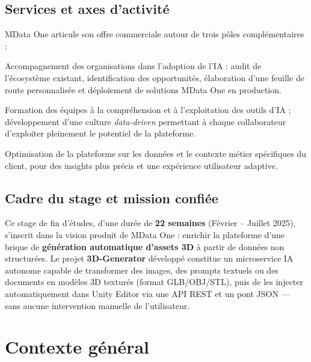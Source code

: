 \documentclass[12pt,a4paper,oneside]{report}
\begin{document}
\subsection{Services et axes d'activité}

MData One articule son offre commerciale autour de trois pôles
complémentaires :

\begin{description}[leftmargin=2.5cm,style=nextline]
  \item[\textbf{AI Integration Consulting}]
    Accompagnement des organisations dans l'adoption de l'IA :
    audit de l'écosystème existant, identification des opportunités,
    élaboration d'une feuille de route personnalisée et déploiement
    de solutions MData One en production.

  \item[\textbf{AI Education \& Enablement}]
    Formation des équipes à la compréhension et à l'exploitation des
    outils d'IA ; développement d'une culture \textit{data-driven}
    permettant à chaque collaborateur d'exploiter pleinement le potentiel
    de la plateforme.

  \item[\textbf{Data Fine-Tuning \& Personalization}]
    Optimisation de la plateforme sur les données et le contexte métier
    spécifiques du client, pour des insights plus précis et une
    expérience utilisateur adaptive.
\end{description}

\subsection{Cadre du stage et mission confiée}

Ce stage de fin d'études, d'une durée de \textbf{22 semaines}
(Février -- Juillet 2025), s'inscrit dans la vision produit de MData One :
enrichir la plateforme d'une brique de \textbf{génération automatique
d'assets 3D} à partir de données non structurées. Le projet
\textbf{3D-Generator} développé constitue un microservice IA autonome
capable de transformer des images, des prompts textuels ou des documents
en modèles 3D texturés (format GLB/OBJ/STL), puis de les injecter
automatiquement dans Unity Editor via une API REST et un pont JSON --- sans aucune
intervention manuelle de l'utilisateur.

\section{Contexte général}
\end{document}
